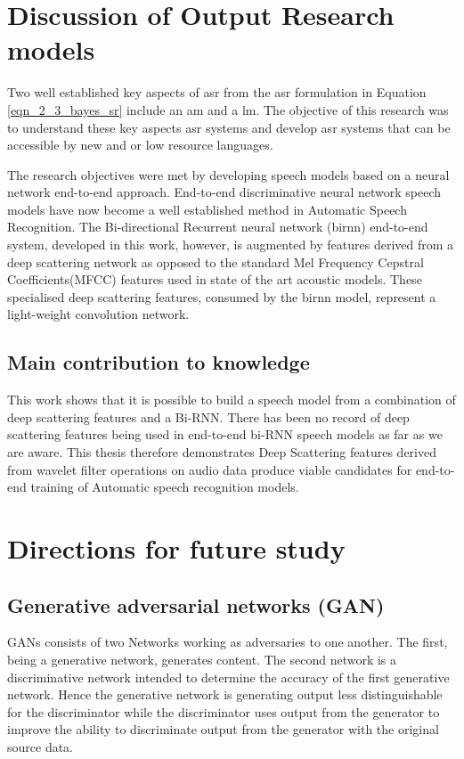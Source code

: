 \section{Discussion of Output Research models}

Two well established key aspects of \acrshort{asr} from the \acrshort{asr} formulation in Equation \ref{eqn_2_3_bayes_sr} include an \acrfull{am} and a \acrfull{lm}. The objective of this research was to understand these key aspects \acrshort{asr} systems and develop \acrshort{asr} systems that can be accessible by new and or low resource languages.

The research objectives were met by developing speech models based on a neural network end-to-end approach. End-to-end discriminative neural network speech models have now become a well established method in Automatic Speech Recognition.   The Bi-directional Recurrent neural network (\acrshort{birnn}) end-to-end system, developed in this work, however, is augmented by features derived from a deep scattering network as opposed to the standard Mel Frequency Cepstral Coefficients(MFCC) features used in state of the art acoustic models.  These specialised deep scattering features, consumed by the \acrshort{birnn} model, represent a light-weight convolution network. 

\subsection{Main contribution to knowledge}
This work shows that it is possible to build a speech model from a combination of deep scattering features and a Bi-RNN. There has been no record of deep scattering features being used in end-to-end bi-RNN speech models as far as we are aware.  This thesis therefore demonstrates Deep Scattering features derived from wavelet filter operations on audio data produce viable candidates for end-to-end training of Automatic speech recognition models.

\stopblue
\section{Directions for future study}
\subsection{Generative adversarial networks (GAN)}

GANs consists of two Networks working as adversaries to one another.  The first, being a generative network, generates content.  The second network is a discriminative network intended to determine the accuracy of the first generative network.  Hence the generative network is generating output less distinguishable for the discriminator while the discriminator uses output from the generator to improve the ability to discriminate output from the generator with the original source data.

